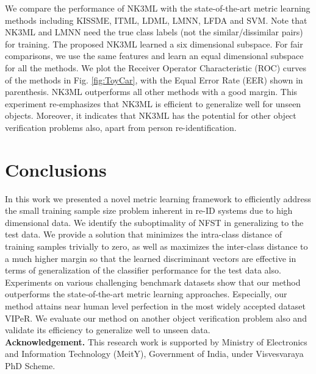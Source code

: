 \documentclass[runningheads]{llncs}
\begin{document}
We compare the performance of NK3ML with the state-of-the-art metric learning methods including KISSME\cite{KISSME}, ITML\cite{ITML}, LDML\cite{LDML}, LMNN\cite{LMNN1,LMNN2}, LFDA\cite{LFDA:ICML,LFDA:CVPR} and SVM\cite{SVM}. Note that NK3ML and LMNN need the true class labels (not the similar/dissimilar pairs) for training. The proposed NK3ML learned a six dimensional subspace. For fair comparisons, we use the same features and learn an equal dimensional subspace for all the methods. We plot the Receiver Operator Characteristic (ROC) curves of the methods in Fig. \ref{fig:ToyCar}, with the Equal Error Rate (EER) shown in parenthesis. NK3ML outperforms all other methods with a good margin. This experiment re-emphasizes that NK3ML is efficient to generalize well for unseen objects. Moreover, it indicates that NK3ML has the potential for other object verification problems also, apart from person re-identification.



\color{black}
\section{Conclusions}
\label{sec:Conclusion}
In this work we presented a novel metric learning framework to efficiently address the small training sample size problem inherent in re-ID systems due to high dimensional data.  We identify the suboptimality of NFST in generalizing to the test data. We provide a solution that  minimizes the intra-class distance of training samples trivially to zero, as well as maximizes the inter-class distance to a much higher margin so that the learned discriminant vectors are effective in terms of generalization of the classifier performance for the test data also. Experiments on various challenging benchmark datasets show that our method outperforms the state-of-the-art metric learning approaches. Especially, our method attains near human level perfection in the most widely accepted dataset VIPeR. We evaluate our method on another object verification problem also and validate its efficiency to generalize well to unseen data.\\

\noindent \textbf{Acknowledgement.} This research work is supported by Ministry of Electronics and Information Technology (MeitY), Government of India, under  Visvesvaraya PhD Scheme. 



\end{document}
